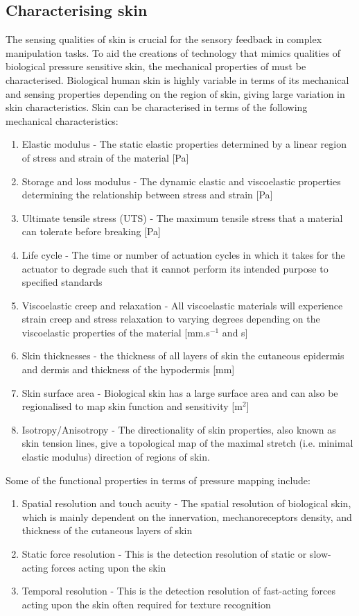 \subsection{Characterising skin}
The sensing qualities of skin is crucial for the sensory feedback in complex manipulation tasks. To aid the creations of technology that mimics qualities of biological pressure sensitive skin, the mechanical properties of must be characterised. Biological human skin is highly variable in terms of its mechanical and sensing properties depending on the region of skin, giving large variation in skin characteristics. Skin can be characterised in terms of the following mechanical characteristics:
\begin{enumerate}
    \item Elastic modulus -  The static elastic properties determined by a linear region of stress and strain of the material [Pa]
    \item Storage and loss modulus - The dynamic elastic and viscoelastic properties determining the relationship between stress and strain [Pa]
    \item Ultimate tensile stress (UTS) - The maximum tensile stress that a material can tolerate before breaking [Pa]
    \item Life cycle - The time or number of actuation cycles in which it takes for the actuator to degrade such that it cannot perform its intended purpose to specified standards
    \item Viscoelastic creep and relaxation - All viscoelastic materials will experience strain creep and stress relaxation to varying degrees depending on the viscoelastic properties of the material [mm.s$^{-1}$ and s]
    \item Skin thicknesses - the thickness of all layers of skin the cutaneous epidermis and dermis and thickness of the hypodermis [mm]
    \item Skin surface area - Biological skin has a large surface area and can also be regionalised to map skin function and sensitivity [m$^2$]
    \item Isotropy/Anisotropy - The directionality of skin properties, also known as skin tension lines, give a topological map of the maximal stretch (i.e. minimal elastic modulus) direction of regions of skin.
\end{enumerate}
Some of the functional properties in terms of pressure mapping include:
\begin{enumerate}
    \item Spatial resolution and touch acuity - The spatial resolution of biological skin, which is mainly dependent on the innervation, mechanoreceptors density, and thickness of the cutaneous layers of skin \cite{Landry2021,Klein2016, Krotoski1993}
    \item Static force resolution - This is the detection resolution of static or slow-acting forces acting upon the skin \cite{Krotoski1993}
    \item Temporal resolution - This is the detection resolution of fast-acting forces acting upon the skin often required for texture recognition \cite{Landry2021,Krotoski1993}
\end{enumerate}

